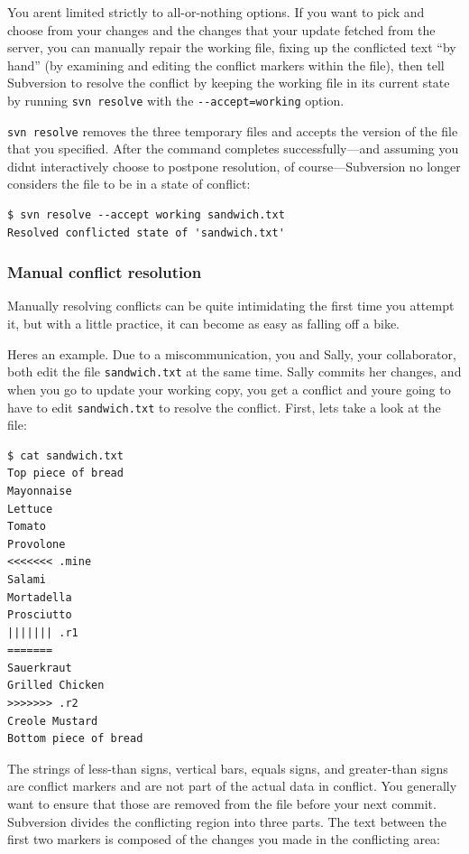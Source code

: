 You aren\textquotesingle t limited strictly to all-or-nothing options.
If you want to pick and choose from your changes and the changes that
your update fetched from the server, you can manually repair the working
file, fixing up the conflicted text ``by hand'' (by examining and
editing the conflict markers within the file), then tell Subversion to
resolve the conflict by keeping the working file in its current state by
running \texttt{svn\ resolve} with the \texttt{-\/-accept=working}
option.

\texttt{svn\ resolve} removes the three temporary files and accepts the
version of the file that you specified. After the command completes
successfully---and assuming you didn\textquotesingle t interactively
choose to postpone resolution, of course---Subversion no longer
considers the file to be in a state of conflict:

\begin{verbatim}
$ svn resolve --accept working sandwich.txt
Resolved conflicted state of 'sandwich.txt'
\end{verbatim}

\subsubsection{Manual conflict
resolution}\label{svn.tour.cycle.resolve.byhand}

Manually resolving conflicts can be quite intimidating the first time
you attempt it, but with a little practice, it can become as easy as
falling off a bike.

Here\textquotesingle s an example. Due to a miscommunication, you and
Sally, your collaborator, both edit the file \texttt{sandwich.txt} at
the same time. Sally commits her changes, and when you go to update your
working copy, you get a conflict and you\textquotesingle re going to
have to edit \texttt{sandwich.txt} to resolve the conflict. First,
let\textquotesingle s take a look at the file:

\begin{verbatim}
$ cat sandwich.txt
Top piece of bread
Mayonnaise
Lettuce
Tomato
Provolone
<<<<<<< .mine
Salami
Mortadella
Prosciutto
||||||| .r1
=======
Sauerkraut
Grilled Chicken
>>>>>>> .r2
Creole Mustard
Bottom piece of bread
\end{verbatim}

The strings of less-than signs, vertical bars, equals signs, and
greater-than signs are conflict markers and are not part of the actual
data in conflict. You generally want to ensure that those are removed
from the file before your next commit. Subversion divides the conflicting
region into three parts. The text between the first two markers is
composed of the changes you made in the conflicting area:

